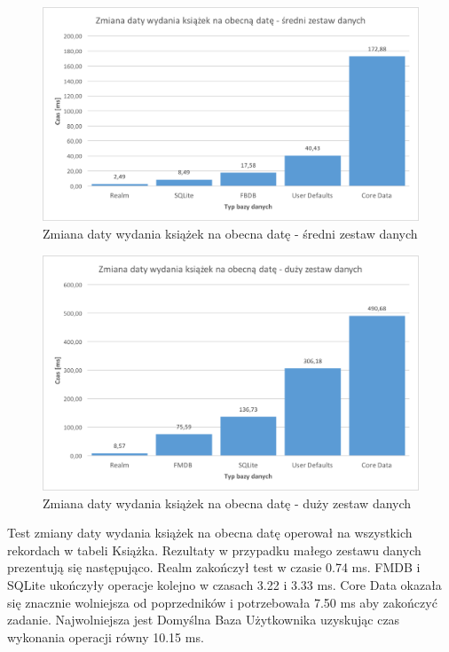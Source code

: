 \begin{figure}[H]
    \centering\includegraphics[width=\linewidth]{img/update_data/update_book/update_book_medium_test.png}
    \caption{Zmiana daty wydania książek na obecna datę - średni zestaw danych}
    \label{img: update-by-book-medium}
\end{figure}

\begin{figure}[H]
    \centering\includegraphics[width=\linewidth]{img/update_data/update_book/update_book_big_test.png}
    \caption{Zmiana daty wydania książek na obecna datę - duży zestaw danych}
    \label{img: update-by-book-big}
\end{figure}

Test zmiany daty wydania książek na obecna datę operował na wszystkich rekordach w tabeli Książka. Rezultaty w przypadku małego zestawu danych prezentują się następująco. Realm zakończył test w czasie 0.74 ms. FMDB i SQLite ukończyły operacje kolejno w czasach 3.22 i 3.33 ms. Core Data okazała się znacznie wolniejsza od poprzedników i potrzebowała 7.50 ms aby zakończyć zadanie. Najwolniejsza jest Domyślna Baza Użytkownika uzyskując czas wykonania operacji równy 10.15 ms. 

